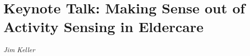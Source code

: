 \documentclass[../booklet.tex]{subfiles}
\begin{document}
\section[Keynote Talk: Making Sense out of Activity Sensing in Eldercare. {\it Jim Keller}]{Keynote Talk: Making Sense out of Activity Sensing in Eldercare}

\begin{center}
  {\it Jim Keller}
\end{center}

\vskip 0.8cm


 
% 
\end{document}
